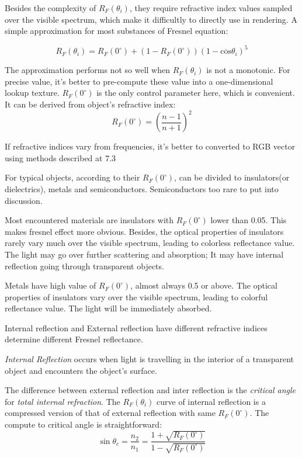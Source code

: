 \documentclass[10pt, a4paper]{article}
\begin{document}
            Besides the complexity of $R_F(\theta_i)$, they require refractive index values sampled over the visible spectrum, which make it difficultly to directly use in rendering. A simple approximation for most substances of Fresnel equation: 

            $$R_F(\theta_i) = R_F(0^{\circ}) + (1 - R_F(0^{\circ}))(1 - \overline{\text{cos}}\theta_i)^5$$

            The approximation performs not so well when $R_F(\theta_i)$ is not a monotonic. For precise value, it's better to pre-compute these value into a one-dimensional lookup texture. $R_F(0^{\circ})$ is the only control parameter here, which is convenient. It can be derived from object's refractive index: 
            $$R_F(0^{\circ}) = (\frac{n - 1}{n + 1})^2$$

            If refractive indices vary from frequencies, it's better to converted to RGB vector using methods described at 7.3\newline 

            For typical objects, according to their $R_F(0^{\circ})$, can be divided to insulators(or dielectrics), metals and semiconductors. Semiconductors too rare to put into discussion. 

            Most encountered materials are insulators with $R_F(0^{\circ})$ lower than 0.05. This makes fresnel effect more obvious. Besides, the optical properties of insulators rarely vary much over the visible spectrum, leading to colorless reflectance value. The light may go over further scattering and absorption; It may have internal reflection going through transparent objects. 

            Metals have high value of $R_F(0^{\circ})$, almost always 0.5 or above. The optical properties of insulators vary over the visible spectrum, leading to colorful reflectance value. The light will be immediately absorbed. 

            Internal reflection and External reflection have different refractive indices determine different Fresnel reflectance. \newline 

            \emph{Internal Reflection} occurs when light is travelling in the interior of a transparent object and encounters the object's surface. 

            The difference between external reflection and inter reflection is the \emph{critical angle} for \emph{total internal refraction}. The $R_F(\theta_i)$ curve of internal reflection is a compressed version of that of external reflection with same $R_F(0^{\circ})$. The compute to critical angle is straightforward: 
            $$\sin{\theta_c} = \frac{n_2}{n_1} = \frac{1 + \sqrt{R_F(0^{\circ})}}{1 - \sqrt{R_F(0^{\circ})}}$$
\end{document}
